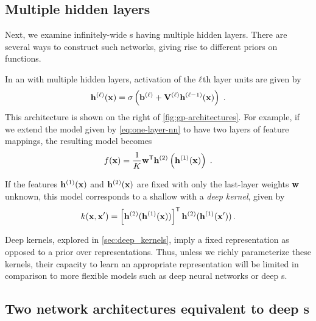 \subsection{Multiple hidden layers}
Next, we examine infinitely-wide \MLP{}s having multiple hidden layers.
There are several ways to construct such networks, giving rise to different priors on functions.

In an \MLP{} with multiple hidden layers, activation of the $\ell$th layer units are given by
%
\begin{align}
{\bf{h}}^{(\ell)}({\bf{x}}) = \sigma \left( {\bf{b}}^{(\ell)} + \mathbf{V}^{(\ell)} {\bf{h}}^{(\ell-1)}({\bf{x}}) \right) \;.
\label{eq:nextlayer}
\end{align}
This architecture is shown on the right of \cref{fig:gp-architectures}.
%
For example, if we extend the model given by \cref{eq:one-layer-nn} to have two layers of feature mappings, the resulting model becomes
%
\begin{align}
f({\bf{x}}) = \frac{1}{K}{\mathbf {{\bf{w}}}}^{\mathsf{T}} {\bf{h}}^{(2)}\left( {\bf{h}}^{(1)}({\bf{x}}) \right) \;.
\label{eq:mutli-layer-nn}
\end{align}

If the features ${\bf{h}}^{(1)}({\bf{x}})$ and ${\bf{h}}^{(2)}({\bf{x}})$ are fixed with only the last-layer weights ${{\bf{w}}}$ unknown, this model corresponds to a shallow \gp{} with a \emph{deep kernel}, given by
\begin{align}
k({\bf{x}}, {\bf{x}}') = \left[ {\bf{h}}^{(2)} ( {\bf{h}}^{(1)}({\bf{x}}) ) \right] ^{\mathsf{T}} {\bf{h}}^{(2)} ({\bf{h}}^{(1)}({\bf{x}}') ) \, .
\end{align}

Deep kernels, explored in \cref{sec:deep_kernels}, imply a fixed representation as opposed to a prior over representations.
Thus, unless we richly parameterize these kernels, their capacity to learn an appropriate representation will be limited in comparison to more flexible models such as deep neural networks or deep \gp{}s. %



 
\subsection{Two network architectures equivalent to deep \sgp{}s}

